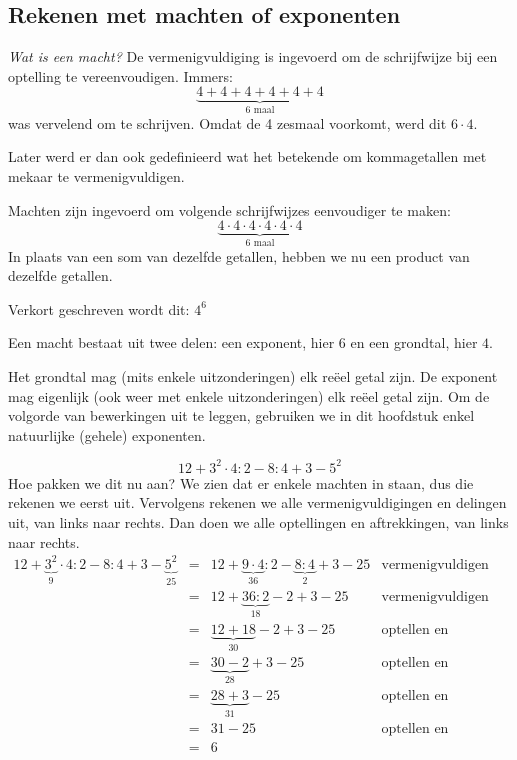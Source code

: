 \subsection{Rekenen met machten of exponenten}
\emph{Wat is een macht?}
De vermenigvuldiging is ingevoerd om de schrijfwijze bij een optelling te vereenvoudigen. Immers:
\begin{equation*}
\underbrace{4+4+4+4+4+4}_{\text{6 maal}}
\end{equation*}
was vervelend om te schrijven. Omdat de 4 zesmaal voorkomt, werd dit $6 \cdot 4$.

Later werd er dan ook gedefinieerd wat het betekende om kommagetallen met mekaar te vermenigvuldigen.

Machten zijn ingevoerd om volgende schrijfwijzes eenvoudiger te maken:
\begin{equation*}
\underbrace{4 \cdot 4\cdot4\cdot4\cdot4\cdot4}_{\text{6 maal}}
\end{equation*}
In plaats van een som van dezelfde getallen, hebben we nu een product van dezelfde getallen.

Verkort geschreven wordt dit: $4^6$

Een macht bestaat uit twee delen: een exponent, hier $6$ en een grondtal, hier $4$.

Het grondtal mag (mits enkele uitzonderingen) elk re\"eel getal zijn. De exponent mag eigenlijk (ook weer met enkele uitzonderingen) elk re\"eel getal zijn. Om de volgorde van bewerkingen uit te leggen, gebruiken we in dit hoofdstuk enkel natuurlijke (gehele) exponenten.

\begin{voorbeeld}
	\begin{equation*}
	12+3^2 \cdot 4 : 2 - 8 : 4 + 3 - 5^2
	\end{equation*}
	Hoe pakken we dit nu aan? We zien dat er enkele machten in staan, dus die rekenen we eerst uit. Vervolgens rekenen we alle vermenigvuldigingen en delingen uit, van links naar rechts. Dan doen we alle optellingen en aftrekkingen, van links naar rechts.
	\begin{equation*}
	\begin{array}{lllr}
	12+\underbrace{3^2}_{9} \cdot 4 : 2 - 8 : 4 + 3 - \underbrace{5^2}_{25} &=& 12+ \underbrace{9 \cdot 4}_{36} : 2 - \underbrace{8 : 4}_{2} + 3 - 25 & \text{vermenigvuldigen en delen} \\
	&=& 12+ \underbrace{36 : 2}_{18} - 2 + 3 - 25 & \text{vermenigvuldigen en delen} \\
	&=& \underbrace{12+18} _{30} - 2 + 3 - 25 & \text{optellen en aftrekken} \\
	&=& \underbrace{30 - 2}_{28} + 3 - 25 & \text{optellen en aftrekken} \\
	&=& \underbrace{28+3}_{31} - 25 & \text{optellen en aftrekken} \\
	&=& 31 - 25 & \text{optellen en aftrekken} \\
	&=& 6 &  \\
	\end{array}
	\end{equation*}
\end{voorbeeld}


